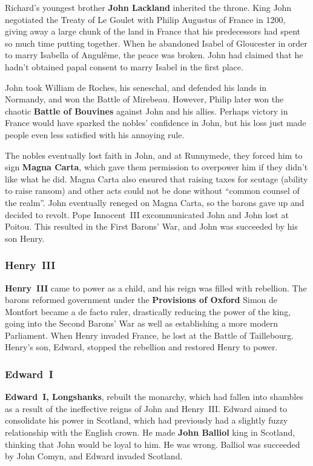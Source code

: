 Richard's youngest brother \textbf{John Lackland} inherited the throne.
King John negotiated the Treaty of Le Goulet with Philip Augustus of France in 1200,
giving away a large chunk of the land in France
that his predecessors had spent so much time putting together.
When he abandoned Isabel of Gloucester in order to marry Isabella of Angul\^eme,
the peace was broken.
John had claimed that he hadn't obtained papal consent to marry Isabel in the first place.

John took William de Roches, his seneschal, and defended his lands in Normandy,
and won the Battle of Mirebeau.
However, Philip later won the chaotic \textbf{Battle of Bouvines} against John and his allies.
Perhaps victory in France would have sparked the nobles' confidence in John,
but his loss just made people even less satisfied with his annoying rule.

The nobles eventually lost faith in John, and at Runnymede,
they forced him to sign \textbf{Magna Carta},
which gave them permission to overpower him if they didn't like what he did.
Magna Carta also ensured that raising taxes for scutage (ability to raise ransom)
and other acts could not be done without ``common counsel of the realm''.
John eventually reneged on Magna Carta, so the barons gave up and decided to revolt.
Pope Innocent~III excommunicated John and John lost at Poitou.
This resulted in the First Barons' War, and John was succeeded by his son Henry.

\subsubsection*{Henry~III}

\textbf{Henry~III} came to power as a child, and his reign was filled with rebellion.
The barons reformed government under the \textbf{Provisions of Oxford}
Simon de Montfort became a de facto ruler, drastically reducing the power of the king,
going into the Second Barons' War as well as establishing a more modern Parliament.
When Henry invaded France, he lost at the Battle of Taillebourg.
Henry's son, Edward, stopped the rebellion and restored Henry to power.

\subsubsection*{Edward~I}

\textbf{Edward~I, Longshanks}, rebuilt the monarchy,
which had fallen into shambles as a result of the ineffective reigns of John and Henry~III\@.
Edward aimed to consolidate his power in Scotland,
which had previously had a slightly fuzzy relationship with the English crown.
He made \textbf{John Balliol} king in Scotland, thinking that John would be loyal to him.
He was wrong.
Balliol was succeeded by John Comyn, and Edward invaded Scotland.

